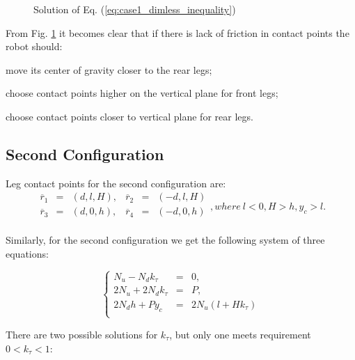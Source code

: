 \documentclass{ws-procs9x6}
\begin{document}
\begin{figure}
  \begin{center}
  \end{center}
  \caption{Solution of Eq. (\ref{eq:case1_dimless_inequality})}
  \label{aba:case1_dimless_figure}
\end{figure}

From Fig. \ref{aba:case1_dimless_figure} it becomes clear that if there is lack of friction in contact points the robot should:
\begin{itemlist}
\item move its center of gravity closer to the rear legs;
\item choose contact points higher on the vertical plane for front legs;
\item choose contact points closer to vertical plane for rear legs.
\end{itemlist}

\subsection{Second Configuration}

Leg contact points for the second configuration are:
\begin{equation}
\label{eq:step_points_phase_2}
\begin{array}{rccccl}
  \overline{r}_1 &=& (d, l, H) , &\overline{r}_2 &=& (-d, l, H) \\
  \overline{r}_3 &=& (d, 0, h) , &\overline{r}_4 &=& (-d, 0, h) \\
\end{array}, where~l<0,H>h,y_c>l.
\end{equation}

Similarly, for the second configuration we get the following system of three equations:

\begin{equation}
\label{eq:case2_final_equations}
\left\{
\begin{array}{rcl}
N_u - N_dk_\tau &=& 0,\\
2N_u + 2N_d k_\tau &=& P,\\
2 N_d h + P y_c &=& 2 N_u (l + H k_\tau)\\
\end{array}
\right.
\end{equation}

There are two possible solutions for $k_\tau$, but only one meets requirement $0<k_\tau<1$:
\end{document}
